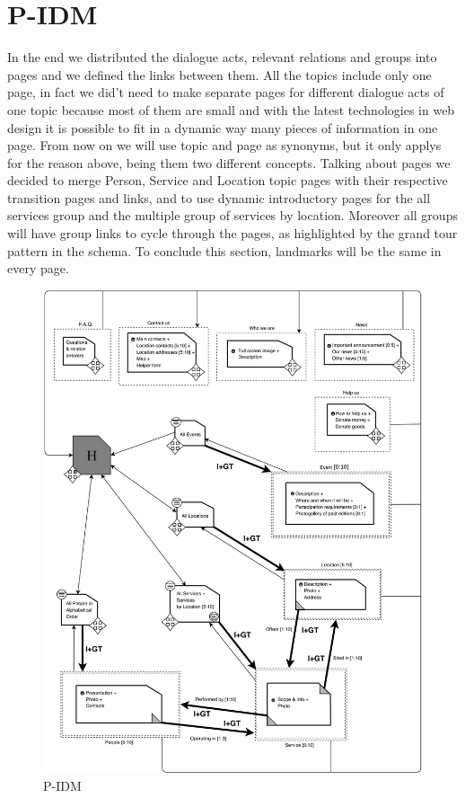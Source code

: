 \section{P-IDM}
%
In the end we distributed the dialogue acts, relevant relations and groups into pages and we defined the links between them. All the topics include only one page, in fact we did't need to make separate pages for different dialogue acts of one topic because most of them are small and with the latest technologies in web design it is possible to fit in a dynamic way many pieces of information in one page. From now on we will use topic and page as synonyms, but it only applys for the reason above, being them two different concepts. Talking about pages we decided to merge Person, Service and Location topic pages with their respective transition pages and links, and to use dynamic introductory pages for the all services group and the multiple group of services by location. Moreover all groups will have group links to cycle through the pages, as highlighted by the grand tour pattern in the schema. To conclude this section, landmarks will be the same in every page.
\begin{figure}[h]
\includegraphics[width=1.17 \textwidth, center]{MainMatter/images/P-IDM.jpg}
\caption{P-IDM}
\label{fig:figure3}
\end{figure}

